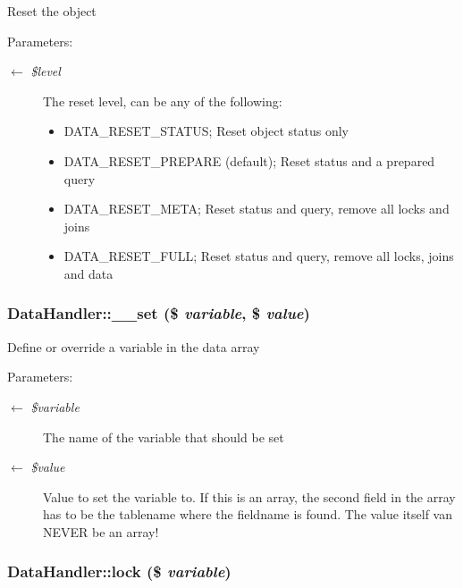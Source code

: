 Reset the object \begin{Desc}
\item[Parameters:]
\begin{description}
\item[\mbox{$\leftarrow$} {\em \$level}]The reset level, can be any of the following:\begin{itemize}
\item DATA\_\-RESET\_\-STATUS; Reset object status only\item DATA\_\-RESET\_\-PREPARE (default); Reset status and a prepared query\item DATA\_\-RESET\_\-META; Reset status and query, remove all locks and joins\item DATA\_\-RESET\_\-FULL; Reset status and query, remove all locks, joins and data \end{itemize}
\end{description}
\end{Desc}
\hypertarget{classDataHandler_16c81c9564a7feaf530ce5d51ed99df7}{
\subsubsection{\setlength{\rightskip}{0pt plus 5cm}DataHandler::\_\-\_\-set (\$ {\em variable}, \$ {\em value})}}
\label{classDataHandler_16c81c9564a7feaf530ce5d51ed99df7}


Define or override a variable in the data array

\begin{Desc}
\item[Parameters:]
\begin{description}
\item[\mbox{$\leftarrow$} {\em \$variable}]The name of the variable that should be set \item[\mbox{$\leftarrow$} {\em \$value}]Value to set the variable to. If this is an array, the second field in the array has to be the tablename where the fieldname is found. The value itself van NEVER be an array! \end{description}
\end{Desc}
\hypertarget{classDataHandler_1229b35655a939fd3c1fe31184057632}{
\subsubsection{\setlength{\rightskip}{0pt plus 5cm}DataHandler::lock (\$ {\em variable})}}
\label{classDataHandler_1229b35655a939fd3c1fe31184057632}


